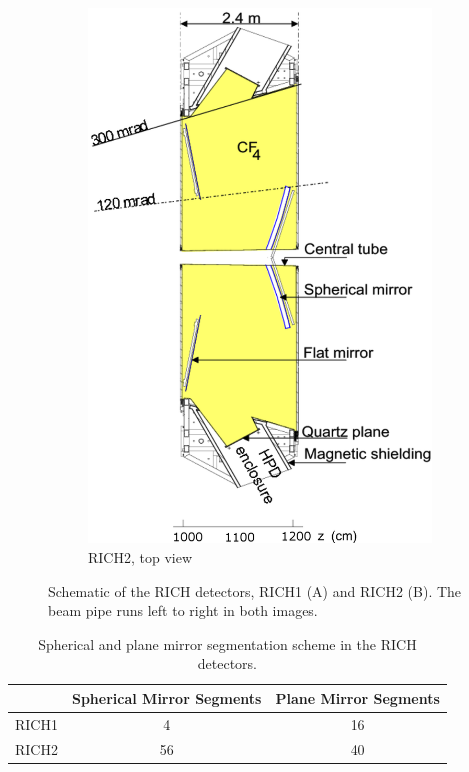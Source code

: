 \begin{figure}[htbp]
\begin{center}
\begin{subfigure}[b]{0.49\textwidth}
			\includegraphics[width=\textwidth]{Chapters/detector/rich/rich2_schematic.png}
			\caption{RICH2, top view}
			\label{fig: rich2_schematic}
		\end{subfigure}
		\caption{Schematic of the RICH detectors, RICH1 (A) and RICH2 (B). The beam pipe runs left to right in both images.}
		\label{fig: rich_system_schematic}
	\end{center}
\end{figure}

\begin{table}[htdp]
	\caption{Spherical and plane mirror segmentation scheme in the RICH detectors.}
	\begin{center}
		\begin{tabular}{|c|c|c|}
			\hline
			& Spherical Mirror Segments & Plane Mirror Segments \\ \hline
			RICH1 & 4 & 16 \\ \hline
			RICH2 & 56 & 40 \\ \hline
		\end{tabular}
	\end{center}
	\label{tab: mirror_segmentation}
\end{table}%

